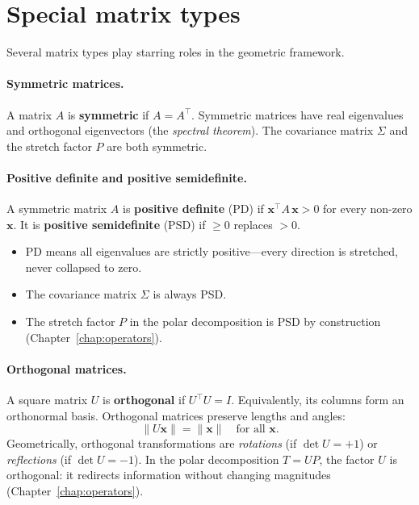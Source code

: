 \documentclass[11pt, twoside, openright]{memoir}
\begin{document}
\section{Special matrix types}
\label{sec:special-matrices}

Several matrix types play starring roles in the geometric framework.

\paragraph{Symmetric matrices.}
A matrix $A$ is \textbf{symmetric} if $A = A^\top$.  Symmetric matrices
have real eigenvalues and orthogonal eigenvectors (the \emph{spectral
theorem}).  The covariance matrix $\Sigma$ and the stretch factor $P$ are
both symmetric.

\paragraph{Positive definite and positive semidefinite.}
A symmetric matrix $A$ is \textbf{positive definite} (PD) if
$\mathbf{x}^\top A\, \mathbf{x} > 0$ for every non-zero $\mathbf{x}$.
It is \textbf{positive semidefinite} (PSD) if $\geq 0$ replaces $> 0$.
\begin{itemize}[nosep]
  \item PD means all eigenvalues are strictly positive---every direction is
    stretched, never collapsed to zero.
  \item The covariance matrix $\Sigma$ is always PSD.
  \item The stretch factor $P$ in the polar decomposition is PSD by
    construction (Chapter~\ref{chap:operators}).
\end{itemize}

\paragraph{Orthogonal matrices.}
A square matrix $U$ is \textbf{orthogonal} if $U^\top U = I$.
Equivalently, its columns form an orthonormal basis.  Orthogonal matrices
preserve lengths and angles:
\[
  \|U\mathbf{x}\| = \|\mathbf{x}\| \quad \text{for all } \mathbf{x}.
\]
Geometrically, orthogonal transformations are \emph{rotations} (if
$\det U = +1$) or \emph{reflections} (if $\det U = -1$).  In the polar
decomposition $T = UP$, the factor $U$ is orthogonal: it redirects
information without changing magnitudes (Chapter~\ref{chap:operators}).
\end{document}
